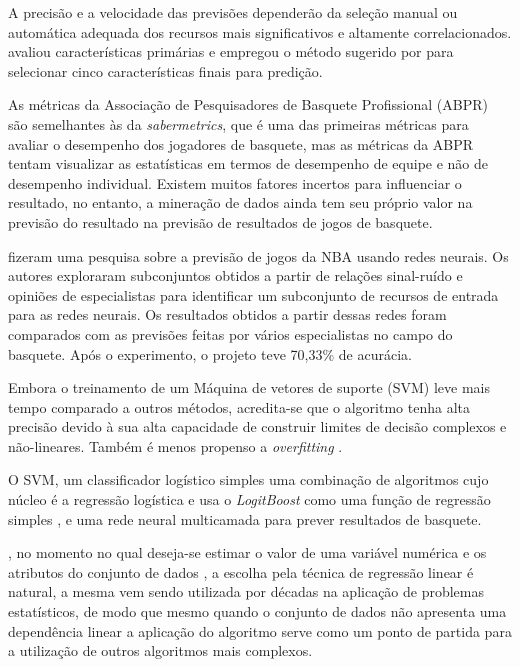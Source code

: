 A precisão e a velocidade das previsões dependerão da seleção manual ou automática adequada dos recursos mais significativos e altamente correlacionados. \cite{Kahn2003} avaliou características primárias e empregou o método sugerido por \cite{Purucker1996} para selecionar cinco características finais para predição.

As métricas da Associação de Pesquisadores de Basquete Profissional (ABPR) são semelhantes às da \textit{sabermetrics}, que é uma das primeiras métricas para avaliar o desempenho dos jogadores de basquete, mas as métricas da ABPR tentam visualizar as estatísticas em termos de desempenho de equipe e não de desempenho individual. Existem muitos fatores incertos para influenciar o resultado, no entanto, a mineração de dados ainda tem seu próprio valor na previsão do resultado na previsão de resultados de jogos de basquete.\cite{Schumaker2010}

 fizeram uma pesquisa sobre a previsão de jogos da NBA usando redes neurais. Os autores exploraram subconjuntos obtidos a partir de relações sinal-ruído e opiniões de especialistas para identificar um subconjunto de recursos de entrada para as redes neurais. Os resultados obtidos a partir dessas redes foram comparados com as previsões feitas por vários especialistas no campo do basquete. Após o experimento, o projeto teve 70,33\% de acurácia.

Embora o treinamento de um Máquina de vetores de suporte (SVM) leve mais tempo comparado a outros métodos, acredita-se que o algoritmo tenha alta precisão devido à sua alta capacidade de construir limites de decisão complexos e não-lineares. Também é menos propenso a \textit{overfitting} \cite{Han2017}. 

O SVM, um classificador logístico simples uma combinação de algoritmos cujo núcleo é a regressão logística e usa o \textit{LogitBoost} como uma função de regressão simples \cite{Landwehr2005}, e uma rede neural multicamada para prever resultados de basquete.

, no momento no qual deseja-se estimar o valor de uma variável numérica e os atributos do  conjunto de dados , a escolha pela técnica de regressão linear é natural, a mesma vem sendo utilizada por décadas na aplicação de problemas estatísticos, de modo que mesmo quando o conjunto de dados não apresenta uma dependência linear a aplicação do algoritmo serve como um ponto de partida para a utilização de outros algoritmos mais complexos.


